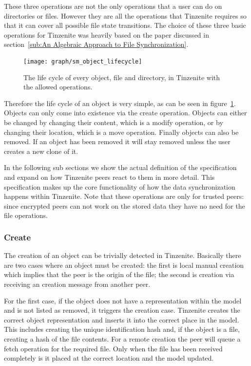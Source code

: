 These three operations are not the only operations that a user can do on directories or files.
However they are all the operations that Tinzenite requires so that it can cover all possible file state transitions.
The choice of these three basic operations for Tinzenite was heavily based on the paper discussed in section~\ref{sub:An Algebraic Approach to File Synchronization}.

\begin{figure}[htp]
\centering
    \texttt{[image: graph/sm\_object\_lifecycle]}
\caption[Object State Diagram]{The life cycle of every object, file and directory, in Tinzenite with the allowed operations.}
\label{diagram:object_operations}
\end{figure}

Therefore the life cycle of an object is very simple, as can be seen in figure~\ref{diagram:object_operations}.
Objects can only come into existence via the create operation.
Objects can either be changed by changing their content, which is a modify operation, or by changing their location, which is a move operation.
Finally objects can also be removed.
If an object has been removed it will stay removed unless the user creates a new clone of it.

In the following sub sections we show the actual definition of the specification and expand on how Tinzenite peers react to them in more detail.
This specification makes up the core functionality of how the data synchronization happens within Tinzenite.
Note that these operations are only for trusted peers: since encrypted peers can not work on the stored data they have no need for the file operations.

\subsubsection{Create}
\label{subs:Create}

The creation of an object can be trivially detected in Tinzenite.
Basically there are two cases where an object must be created: the first is local manual creation which implies that the peer is the origin of the file; the second is creation via receiving an creation message from another peer.

For the first case, if the object does not have a representation within the model and is not listed as removed, it triggers the creation case.
Tinzenite creates the correct object representation and inserts it into the correct place in the model.
This includes creating the unique identification hash and, if the object is a file, creating a hash of the file contents.
For a remote creation the peer will queue a fetch operation for the required file.
Only when the file has been received completely is it placed at the correct location and the model updated.


